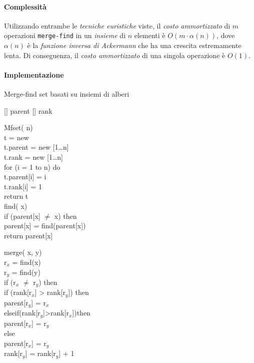 \paragraph{Complessità}
Utilizzando entrambe le \emph{tecniche euristiche} viste, il \emph{costo
ammortizzato} di $m$ operazioni \texttt{merge-find} in un \emph{insieme} di $n$
elementi è $O(m\cdot\alpha(n))$, dove $\alpha(n)$ è la \emph{funzione inversa di
Ackermann} che ha una crescita estremamente lenta\footnotemark. Di conseguenza,
il \emph{costo ammortizzato} di una singola operazione è $O(1)$.


\newpage
\paragraph{Implementazione}
\begin{code}{Merge-find set basati su insiemi di alberi}
\begin{minipage}[t]{0.48\textwidth}
[] parent\hfill{}
[] rank\hfill{}

\ind{} Mfset( n)\\
     t = new \\
    t.parent = new [1\dots n]\\
    t.rank = new [1\dots n]\\
    \indf for (i = 1 to n) do\\
        t.parent[i] = i\\
        t.rank[i] = 1\\
    \indf return t\\

\ind{} find( x)\\
    \indf if (parent[x] $\neq$ x) then\\
        parent[x] = find(parent[x])\\
    \indf return parent[x]\\
\end{minipage}
\hfill
\begin{minipage}[t]{0.48\textwidth}
    \ind merge( x,  y)\\
         r$_x$ = find(x)\\
         r$_y$ = find(y)\\
        \indf if (r$_x$ $\neq$ r$_y$) then\\
            \indff if (rank[r$_x$] > rank[r$_y$]) then\\
                parent[r$_y$] = r$_x$\\
            \indff else\:if\:(rank[r$_y$]\;>\;rank[r$_x$])\:then\\
                parent[r$_x$] = r$_y$\\
            \indff else\\
                parent[r$_x$] = r$_y$\\
                rank[r$_y$] = rank[r$_y$] + 1\\
\end{minipage}
\end{code}

